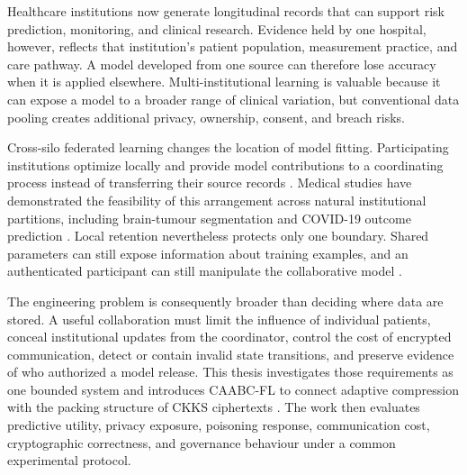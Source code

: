 

Healthcare institutions now generate longitudinal records that can support risk
prediction, monitoring, and clinical research. Evidence held by one hospital,
however, reflects that institution's patient population, measurement practice,
and care pathway. A model developed from one source can therefore lose accuracy
when it is applied elsewhere. Multi-institutional learning is valuable because it
can expose a model to a broader range of clinical variation, but conventional
data pooling creates additional privacy, ownership, consent, and breach risks.

Cross-silo federated learning changes the location of model fitting. Participating
institutions optimize locally and provide model contributions to a coordinating
process instead of transferring their source records \cite{mcmahan2017fedavg}.
Medical studies have demonstrated the feasibility of this arrangement across
natural institutional partitions, including brain-tumour segmentation and
COVID-19 outcome prediction \cite{sheller2020federated,dayan2021federated}.
Local retention nevertheless protects only one boundary. Shared parameters can
still expose information about training examples, and an authenticated
participant can still manipulate the collaborative model
\cite{shokri2017membership,zhu2019dlg,bagdasaryan2020backdoor}.

The engineering problem is consequently broader than deciding where data are
stored. A useful collaboration must limit the influence of individual patients,
conceal institutional updates from the coordinator, control the cost of encrypted
communication, detect or contain invalid state transitions, and preserve evidence
of who authorized a model release. This thesis investigates those requirements as
one bounded system and introduces CAABC-FL to connect adaptive compression with
the packing structure of CKKS ciphertexts \cite{cheon2017homomorphic}. The work
then evaluates predictive utility, privacy exposure, poisoning response,
communication cost, cryptographic correctness, and governance behaviour under a
common experimental protocol.

